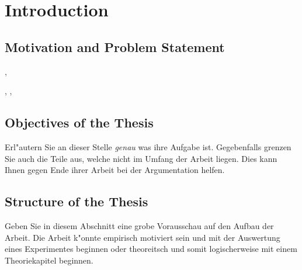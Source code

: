 \chapter[Introduction]{Introduction}

\section{Motivation and Problem Statement}

\cite{alzint_dementia_statistics}, \cite{who_dementia_factsheet}

\cite{Zucchella.2018}

\cite{Mably.2018}, \cite{Iaccarino.2016}, \cite{Martorell.2019}

\section{Objectives of the Thesis}

Erl"autern Sie an dieser Stelle \emph{genau} was ihre Aufgabe ist. Gegebenfalls grenzen Sie auch die Teile aus, welche nicht im Umfang der Arbeit liegen. Dies kann Ihnen gegen Ende ihrer Arbeit bei der Argumentation helfen.

\section{Structure of the Thesis}

Geben Sie in diesem Abschnitt eine grobe Vorausschau auf den Aufbau der Arbeit. Die Arbeit k"onnte empirisch motiviert sein und mit der Auswertung eines Experimentes beginnen oder theoreitsch und somit logischerweise mit einem Theoriekapitel beginnen.
